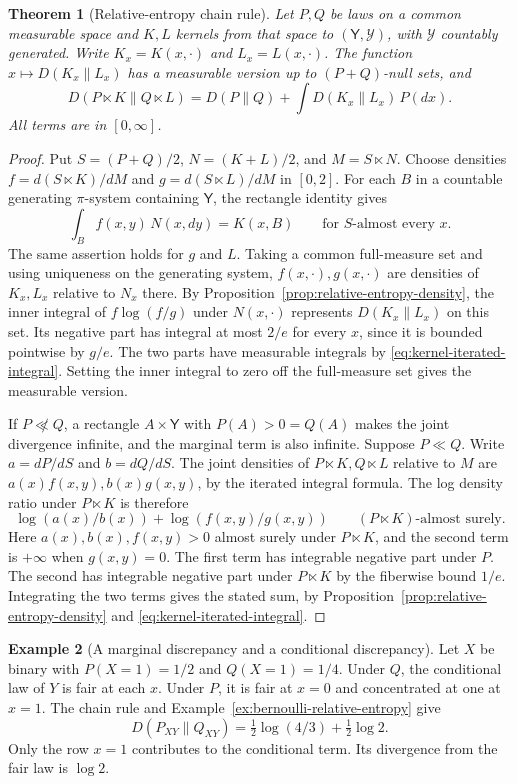 \documentclass[11pt,oneside]{book}
\newtheorem{theorem}{Theorem}[chapter]
\theoremstyle{definition}
\newtheorem{example}[theorem]{Example}
\theoremstyle{remark}
\begin{document}
\begin{theorem}[Relative-entropy chain rule]
\label{thm:relative-entropy-chain-rule}
Let $P,Q$ be laws on a common measurable space and $K,L$ kernels from
that space to $(\mathsf Y,\mathcal Y)$, with $\mathcal Y$ countably
generated. Write $K_x=K(x,\cdot)$ and $L_x=L(x,\cdot)$. The function
$x\mapsto D(K_x\|L_x)$ has a measurable version up to $(P+Q)$-null sets,
and
\[
D(P\ltimes K\|Q\ltimes L)=D(P\|Q)+\int D(K_x\|L_x)\,P(dx).
\]
All terms are in $[0,\infty]$.
\end{theorem}
\begin{proof}
Put $S=(P+Q)/2$, $N=(K+L)/2$, and $M=S\ltimes N$. Choose densities
$f=d(S\ltimes K)/dM$ and $g=d(S\ltimes L)/dM$ in $[0,2]$.
For each $B$ in a countable generating $\pi$-system containing
$\mathsf Y$, the rectangle identity gives
\[
\int_B f(x,y)\,N(x,dy)=K(x,B)
\qquad\text{for }S\text{-almost every }x.
\]
The same assertion holds for $g$ and $L$. Taking a common
full-measure set and using uniqueness on the generating system,
$f(x,\cdot),g(x,\cdot)$ are densities of $K_x,L_x$ relative to $N_x$
there. By Proposition~\ref{prop:relative-entropy-density},
the inner integral of $f\log(f/g)$ under $N(x,\cdot)$ represents
$D(K_x\|L_x)$ on this set. Its negative part has integral at most
$2/e$ for every $x$, since it is bounded pointwise by $g/e$.
The two parts have measurable integrals by
\eqref{eq:kernel-iterated-integral}. Setting the inner integral to zero
off the full-measure set gives the measurable version.

If $P\not\ll Q$, a rectangle $A\times\mathsf Y$ with $P(A)>0=Q(A)$
makes the joint divergence infinite, and the marginal term is
also infinite. Suppose $P\ll Q$. Write $a=dP/dS$ and $b=dQ/dS$.
The joint densities of $P\ltimes K,Q\ltimes L$ relative to $M$
are $a(x)f(x,y),b(x)g(x,y)$, by the iterated integral formula.
The log density ratio under $P\ltimes K$ is therefore
\[
\log(a(x)/b(x))+\log(f(x,y)/g(x,y))
\qquad (P\ltimes K)\text{-almost surely}.
\]
Here $a(x),b(x),f(x,y)>0$ almost surely under $P\ltimes K$,
and the second term is $+\infty$ when $g(x,y)=0$.
The first term has integrable negative part under $P$.
The second has integrable negative part under $P\ltimes K$
by the fiberwise bound $1/e$. Integrating the two terms gives
the stated sum, by Proposition~\ref{prop:relative-entropy-density}
and \eqref{eq:kernel-iterated-integral}.
\end{proof}

\begin{example}[A marginal discrepancy and a conditional discrepancy]
\label{ex:relative-entropy-chain-bits}
Let $X$ be binary with $P(X=1)=1/2$ and $Q(X=1)=1/4$.
Under $Q$, the conditional law of $Y$ is fair at each $x$.
Under $P$, it is fair at $x=0$ and concentrated at one at $x=1$.
The chain rule and Example~\ref{ex:bernoulli-relative-entropy} give
\[
D(P_{XY}\|Q_{XY})
=\tfrac12\log(4/3)+\tfrac12\log 2.
\]
Only the row $x=1$ contributes to the conditional term. Its
divergence from the fair law is $\log 2$.
\end{example}
\end{document}
